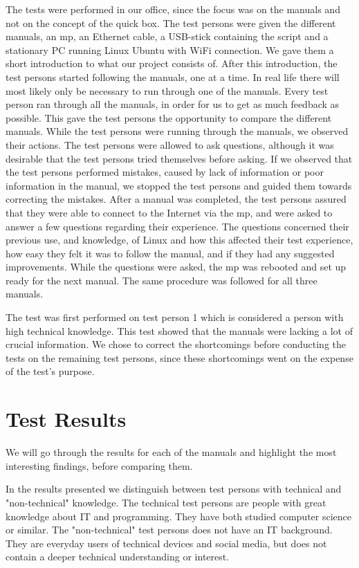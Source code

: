 The tests were performed in our office, since the focus was on the manuals and not on the concept of the \gls{quick} box. The test persons were given the different manuals, an \gls{mp}, an Ethernet cable, a USB-stick containing the script and a stationary PC running Linux Ubuntu with WiFi connection. We gave them a short introduction to what our project consists of. After this introduction, the test persons started following the manuals, one at a time. In real life there will most likely only be necessary to run through one of the manuals. Every test person ran through all the manuals, in order for us to get as much feedback as possible. This gave the test persons the opportunity to compare the different manuals. While the test persons were running through the manuals, we observed their actions. The test persons were allowed to ask questions, although it was desirable that the test persons tried themselves before asking. If we observed that the test persons performed mistakes, caused by lack of information or poor information in the manual, we stopped the test persons and guided them towards correcting the mistakes. After a manual was completed, the test persons assured that they were able to connect to the Internet via the \gls{mp}, and were asked to answer a few questions regarding their experience. The questions concerned their previous use, and knowledge, of Linux and how this affected their test experience, how easy they felt it was to follow the manual, and if they had any suggested improvements.
While the questions were asked, the \gls{mp} was rebooted and set up ready for the next manual. The same procedure was followed for all three  manuals. 

The test was first performed on test person 1 which is considered a person with high technical knowledge. This test showed that the manuals were lacking a lot of crucial information. We chose to correct the shortcomings before conducting the tests on the remaining test persons, since these shortcomings went on the expense of the test's purpose. 

\section{Test Results}
We will go through the results for each of the manuals and highlight the most interesting findings, before comparing them. 

In the results presented we distinguish between test persons with technical and "non-technical" knowledge. The technical test persons are people with great knowledge about IT and programming. They have both studied computer science or similar. The "non-technical" test persons does not have an IT background. They are everyday users of technical devices and social media, but does not contain a deeper technical understanding or interest. 
 
